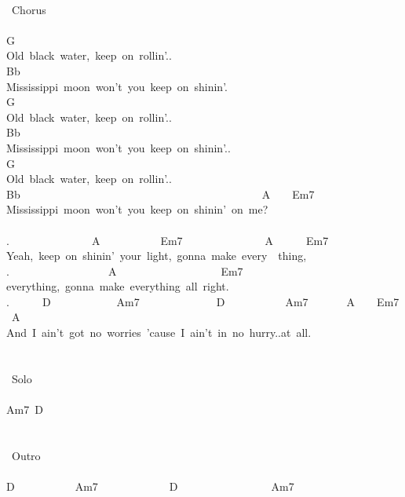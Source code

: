 {\\
\lbrack\ Chorus\rbrack\\
\\
G\\
Old\ black\ water,\ keep\ on\ rollin'..\ \ \ \\
Bb\ \ \ \ \ \ \ \ \ \ \ \ \ \ \ \ \ \ \ \ \ \ \ \ \ \ \ \ \ \ \ \ \ \ \ \ \ \ \ \ \ \ \ \ \ \\
Mississippi\ moon\ won't\ you\ keep\ on\ shinin'.\\
G\ \ \ \ \ \ \ \ \ \ \ \ \ \ \ \ \ \ \ \ \ \ \ \ \ \ \ \ \ \ \ \ \ \ \ \ \ \ \ \ \ \ \ \ \ \ \ \ \\
Old\ black\ water,\ keep\ on\ rollin'..\\
Bb\ \ \ \ \ \ \ \ \ \ \ \ \ \ \ \ \ \ \ \ \ \ \ \ \ \ \ \ \ \ \ \ \ \ \ \ \ \ \ \ \ \ \ \ \\
Mississippi\ moon\ won't\ you\ keep\ on\ shinin'..\\
G\\
Old\ black\ water,\ keep\ on\ rollin'..\\
Bb\ \ \ \ \ \ \ \ \ \ \ \ \ \ \ \ \ \ \ \ \ \ \ \ \ \ \ \ \ \ \ \ \ \ \ \ \ \ \ \ \ \ \ \ A\ \ \ \ Em7\ \\
Mississippi\ moon\ won't\ you\ keep\ on\ shinin'\ on\ me?\\
\\
.\ \ \ \ \ \ \ \ \ \ \ \ \ \ \ A\ \ \ \ \ \ \ \ \ \ \ Em7\ \ \ \ \ \ \ \ \ \ \ \ \ \ \ A\ \ \ \ \ \ Em7\ \ \\
Yeah,\ keep\ on\ shinin'\ your\ light,\ gonna\ make\ every\ \ thing,\\
.\ \ \ \ \ \ \ \ \ \ \ \ \ \ \ \ \ \ A\ \ \ \ \ \ \ \ \ \ \ \ \ \ \ \ \ \ \ Em7\\
everything,\ gonna\ make\ everything\ all\ right.\\
.\ \ \ \ \ \ D\ \ \ \ \ \ \ \ \ \ \ \ Am7\ \ \ \ \ \ \ \ \ \ \ \ \ \ D\ \ \ \ \ \ \ \ \ \ \ Am7\ \ \ \ \ \ \ A\ \ \ \ Em7\ A\\
And\ I\ ain't\ got\ no\ worries\ 'cause\ I\ ain't\ in\ no\ hurry..at\ all.\\
\\
\\
\lbrack\ Solo\rbrack\\
\\
Am7\ D\ \\
\\
\\
\lbrack\ Outro\rbrack\\
\ \\
D\ \ \ \ \ \ \ \ \ \ \ Am7\ \ \ \ \ \ \ \ \ \ \ \ \ D\ \ \ \ \ \ \ \ \ \ \ \ \ \ \ \ \ Am7\ \ \ \ \ \ \ \ \ \ \ \ \ \ \ \ \ \ \ \ \ \ \ \ \ \ \ \\
}
